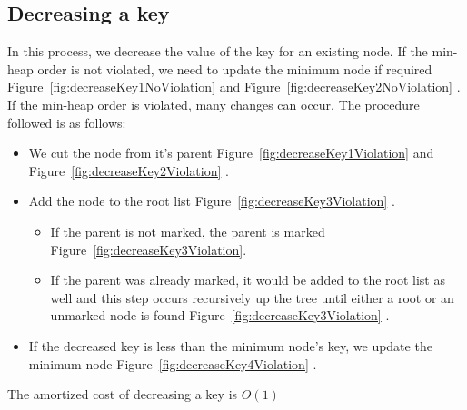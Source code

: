 \subsection{Decreasing a key}
In this process, we decrease the value of the key for an existing node. If the min-heap order is not violated, we need to update the minimum node if required Figure~\ref{fig:decreaseKey1NoViolation} and Figure~\ref{fig:decreaseKey2NoViolation} . If the min-heap order is violated, many changes can occur. The procedure followed is as follows:
\begin{itemize}
	\item We cut the node from it's parent Figure~\ref{fig:decreaseKey1Violation} and Figure~\ref{fig:decreaseKey2Violation} .
	\item Add the node to the root list Figure~\ref{fig:decreaseKey3Violation} . 
	\begin{itemize}
	\item If the parent is not marked, the parent is marked Figure~\ref{fig:decreaseKey3Violation}.
	\item If the parent was already marked, it would be added to the root list as well and this step occurs recursively up the tree until either a root or an unmarked node is found Figure~\ref{fig:decreaseKey3Violation} .
	\end{itemize}
	\item If the decreased key is less than the minimum node's key, we update the minimum node Figure~\ref{fig:decreaseKey4Violation} . 
\end{itemize}
The amortized cost of decreasing a key is $O(1)$


